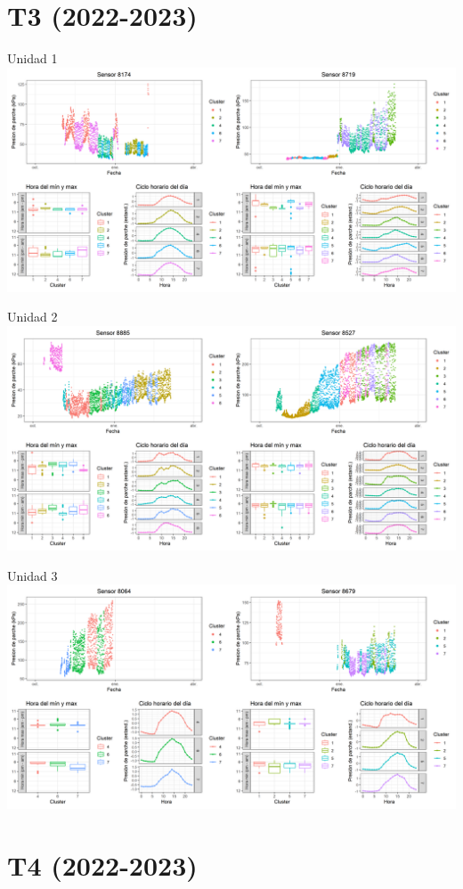 \documentclass[
  letterpaper,
  DIV=11,
  numbers=noendperiod]{scrreprt}
\begin{document}
\chapter{T3 (2022-2023)}

Unidad 1
\includegraphics{figuras/02_turgor_limpiado/2022_2023_La_Esperanza_T3_Unidad_1.png}

Unidad 2
\includegraphics{figuras/02_turgor_limpiado/2022_2023_La_Esperanza_T3_Unidad_2.png}

Unidad 3
\includegraphics{figuras/02_turgor_limpiado/2022_2023_La_Esperanza_T3_Unidad_3.png}

\chapter{T4 (2022-2023)}
\end{document}
